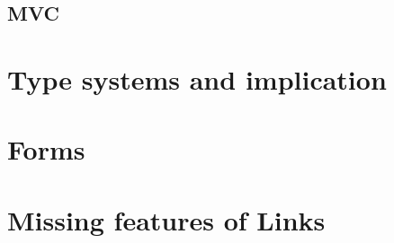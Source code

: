 \subsection{MVC}

\section{Type systems and implication}

\section{Forms}

\section{Missing features of Links}
